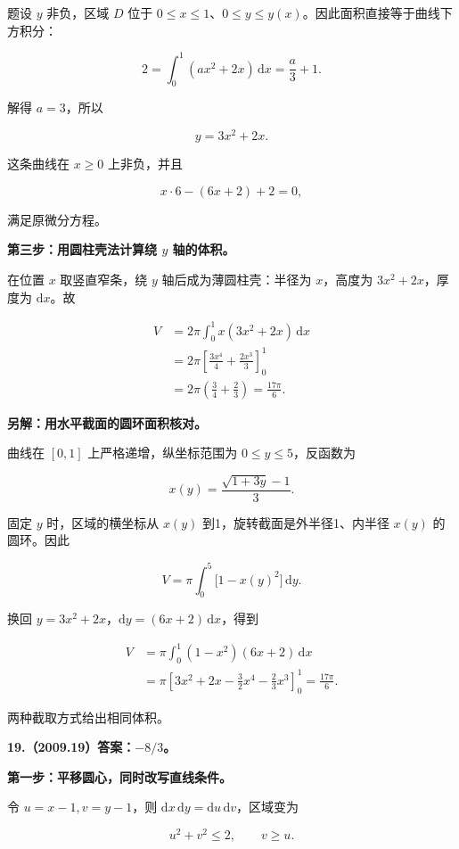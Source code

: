 \documentclass[UTF8,11pt,fontset=windows]{ctexart}
\begin{document}
题设 $y$ 非负，区域 $D$ 位于 $0\le x\le1$、$0\le y\le y(x)$。因此面积直接等于曲线下方积分：

$$
2=\int_0^1(ax^2+2x)\,\mathrm dx
=\frac a3+1.
$$

解得 $a=3$，所以

$$
\boxed{y=3x^2+2x}.
$$

这条曲线在 $x\ge0$ 上非负，并且

$$
x\cdot6-(6x+2)+2=0,
$$

满足原微分方程。

\textbf{第三步：用圆柱壳法计算绕 $y$ 轴的体积。}

在位置 $x$ 取竖直窄条，绕 $y$ 轴后成为薄圆柱壳：半径为 $x$，高度为 $3x^2+2x$，厚度为 $\mathrm dx$。故

$$
\begin{aligned}
V&=2\pi\int_0^1x(3x^2+2x)\,\mathrm dx\\
&=2\pi\left[\frac{3x^4}{4}+\frac{2x^3}{3}\right]_0^1\\
&=2\pi\left(\frac34+\frac23\right)
=\boxed{\frac{17\pi}{6}}.
\end{aligned}
$$

\textbf{另解：用水平截面的圆环面积核对。}

曲线在 $[0,1]$ 上严格递增，纵坐标范围为 $0\le y\le5$，反函数为

$$
x(y)=\frac{\sqrt{1+3y}-1}{3}.
$$

固定 $y$ 时，区域的横坐标从 $x(y)$ 到1，旋转截面是外半径1、内半径 $x(y)$ 的圆环。因此

$$
V=\pi\int_0^5\bigl[1-x(y)^2\bigr]\,\mathrm dy.
$$

换回 $y=3x^2+2x$，$\mathrm dy=(6x+2)\,\mathrm dx$，得到

$$
\begin{aligned}
V&=\pi\int_0^1(1-x^2)(6x+2)\,\mathrm dx\\
&=\pi\left[3x^2+2x-\frac32x^4-\frac23x^3\right]_0^1
=\frac{17\pi}{6}.
\end{aligned}
$$

两种截取方式给出相同体积。

\clearpage

\textbf{19.（2009.19）答案：$-8/3$。}

\textbf{第一步：平移圆心，同时改写直线条件。}

令 $u=x-1,v=y-1$，则 $\mathrm dx\,\mathrm dy=\mathrm du\,\mathrm dv$，区域变为

$$
u^2+v^2\le2,\qquad v\ge u.
$$
\end{document}
